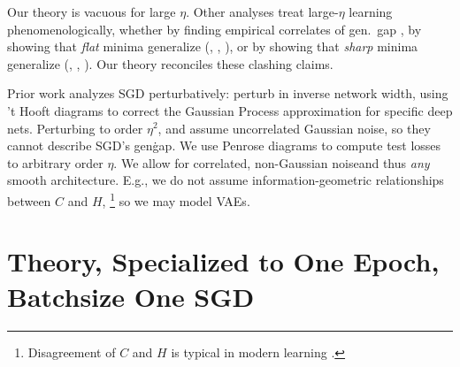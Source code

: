 \documentclass{article}
\theoremstyle{plain}
\theoremstyle{definition}
\begin{document}

    Our theory is vacuous for large $\eta$.  Other analyses treat
    large-$\eta$ learning phenomenologically, whether by finding empirical
    correlates of gen.\ gap \citep{li18}, by showing that \emph{flat} minima
    generalize (\cite{ho17}, \cite{ke17}, \cite{wa18}), or by showing that
    \emph{sharp} minima generalize (\cite{st56}, \cite{di17}, \cite{wu18}).
    Our theory reconciles these clashing claims.
    

    Prior work analyzes SGD perturbatively: \cite{dy19} perturb in inverse
    network width, using 't Hooft diagrams to correct the Gaussian Process
    approximation for specific deep nets.  Perturbing to order $\eta^2$,
    \cite{ch18} and \cite{li17} assume uncorrelated Gaussian noise, so they
    cannot describe SGD's gen\. gap.  We use Penrose diagrams to compute test
    losses to arbitrary order $\eta$.  We allow for correlated, non-Gaussian
    noiseand thus \emph{any} smooth architecture.  E.g., we do not assume
    information-geometric relationships between $C$ and
    $H$,
    \footnote{
        Disagreement of $C$ and $H$ is typical in modern learning \citep{ro12,
        ku19}.
    }
    so we may model VAEs. 


\section{Theory, Specialized to One Epoch, Batchsize One SGD} \label{sect:calculus}
\end{document}
